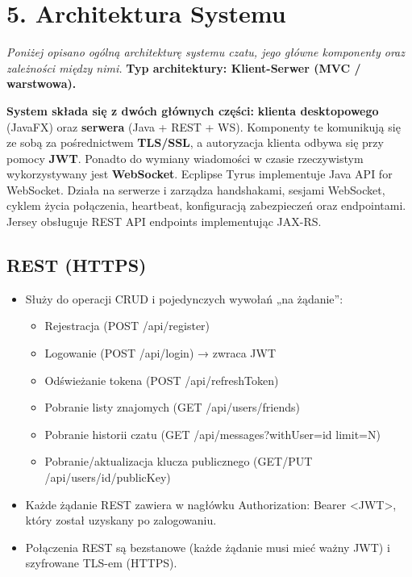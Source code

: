 \documentclass[a4paper,12pt]{article}
\begin{document}
\section*{5. Architektura Systemu}
\textit{Poniżej opisano ogólną architekturę systemu czatu, jego główne komponenty oraz zależności między nimi.}
\vspace{0.5 cm}
 \noindent
\textbf{Typ architektury: Klient-Serwer (MVC / warstwowa).}

\textbf{System składa się z dwóch głównych części:}
\textbf{klienta desktopowego} (JavaFX) oraz
\textbf{serwera} (Java + REST + WS). Komponenty te komunikują się ze sobą za pośrednictwem
\textbf{TLS/SSL}, a autoryzacja klienta odbywa się przy pomocy
\textbf{JWT}. Ponadto do wymiany wiadomości w czasie rzeczywistym wykorzystywany jest
\textbf{WebSocket}. Ecplipse Tyrus implementuje Java API for WebSocket. Działa na serwerze i zarządza handshakami, sesjami WebSocket,
cyklem życia połączenia, heartbeat, konfiguracją zabezpieczeń oraz endpointami. Jersey obsługuje REST API endpoints implementując JAX-RS.


\subsection*{REST (HTTPS)}
\begin{itemize}
    \item Służy do operacji CRUD i pojedynczych wywołań „na żądanie”:
    \begin{itemize}
        \item Rejestracja (POST /api/register)
        \item Logowanie (POST /api/login) → zwraca JWT
        \item Odświeżanie tokena (POST /api/refreshToken)
        \item Pobranie listy znajomych (GET /api/users/friends)
        \item Pobranie historii czatu (GET /api/messages?withUser={id} limit={N})
        \item Pobranie/aktualizacja klucza publicznego (GET/PUT /api/users/{id}/publicKey)
    \end{itemize}
    \item Każde żądanie REST zawiera w nagłówku Authorization: Bearer <JWT>, który został uzyskany po zalogowaniu.
    \item Połączenia REST są bezstanowe (każde żądanie musi mieć ważny JWT) i szyfrowane TLS-em (HTTPS).
\end{itemize}
\end{document}
